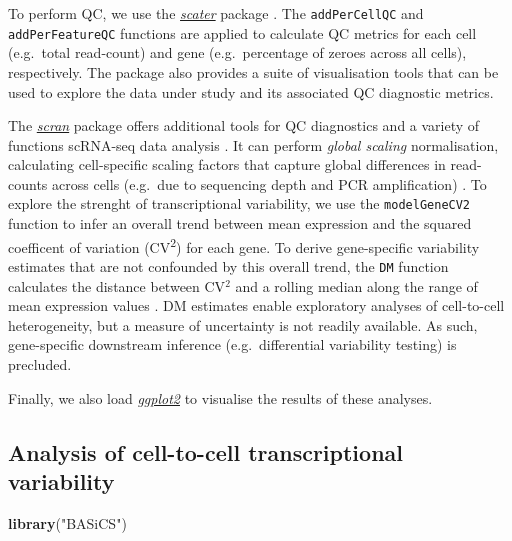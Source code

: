 \documentclass[9pt,a4paper,]{extarticle}
\newenvironment{Shaded}{\begin{snugshade}}{\end{snugshade}}
\newcommand{\KeywordTok}[1]{\textcolor[rgb]{0.13,0.29,0.53}{\textbf{#1}}}
\newcommand{\NormalTok}[1]{#1}
\newcommand{\StringTok}[1]{\textcolor[rgb]{0.31,0.60,0.02}{#1}}
\begin{document}
To perform QC, we use the \emph{\href{https://bioconductor.org/packages/3.11/scater}{scater}} package \citep{McCarthy2017}.
The \texttt{addPerCellQC} and \texttt{addPerFeatureQC} functions are applied to calculate
QC metrics for each cell (e.g.~total read-count) and gene (e.g.~percentage of
zeroes across all cells), respectively.
The package also provides a suite of visualisation tools that can be used to
explore the data under study and its associated QC diagnostic metrics.

The \emph{\href{https://bioconductor.org/packages/3.11/scran}{scran}} package offers additional tools for QC
diagnostics and a variety of functions scRNA-seq data analysis \citep{Lun2016}.
It can perform \emph{global scaling} normalisation, calculating cell-specific
scaling factors that capture global differences in read-counts across cells
(e.g.~due to sequencing depth and PCR amplification) \citep{Lun2016pooling}.
To explore the strenght of transcriptional variability, we use the \texttt{modelGeneCV2}
function to infer an overall trend between mean expression and the
squared coefficent of variation (CV\textsuperscript{2}) for each gene.
To derive gene-specific variability estimates that are not confounded by this
overall trend, the \texttt{DM} function calculates the distance between CV\(^2\) and a
rolling median along the range of mean expression values \citep{Kolodziejczyk2015cell}.
DM estimates enable exploratory analyses of cell-to-cell heterogeneity, but a
measure of uncertainty is not readily available. As such, gene-specific
downstream inference (e.g.~differential variability testing) is precluded.

Finally, we also load \emph{\href{https://CRAN.R-project.org/package=ggplot2}{ggplot2}} to visualise the results of these
analyses.

\hypertarget{analysis-of-cell-to-cell-transcriptional-variability}{%
\subsection{Analysis of cell-to-cell transcriptional variability}\label{analysis-of-cell-to-cell-transcriptional-variability}}

\begin{Shaded}
\begin{Highlighting}[]
\KeywordTok{library}\NormalTok{(}\StringTok{"BASiCS"}\NormalTok{)}
\end{Highlighting}
\end{Shaded}
\end{document}
